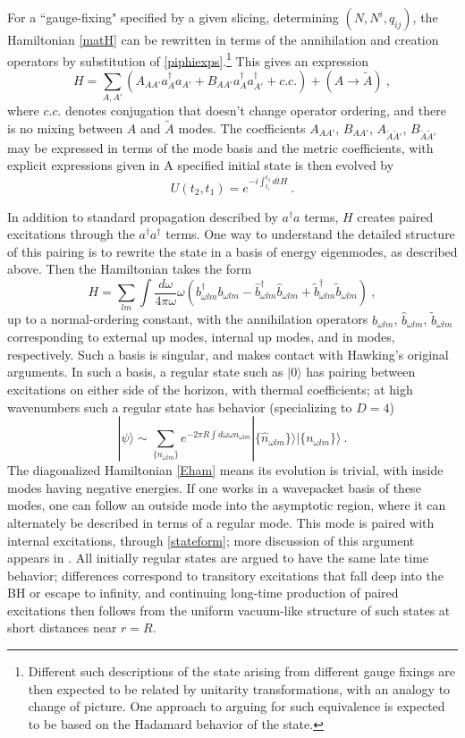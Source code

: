 \documentclass[12pt]{article}
\numberwithin{equation}{section}
\newcommand{\beq}{\begin{equation}}
\newcommand{\eeq}{\end{equation}}
\newcommand{\tA}{{\tilde A}}
\begin{document}
For a ``gauge-fixing" specified by a  given slicing, determining $(N, N^i, q_{ij})$, the Hamiltonian \eqref{matH} can be rewritten in terms of the annihilation and creation operators by substitution of \eqref{piphiexps}.\footnote{Different such descriptions of the state arising from different gauge fixings are then expected to be related by unitarity transformations, with an analogy to change of picture.  One approach to arguing for such equivalence is expected to be based on the Hadamard behavior of the state\cite{KaWa}.} This gives an expression
\beq\label{Hama}
H = \sum_{A,A'} \left(A_{AA'} a^\dagger_A a_{A'} + B_{AA'} a^\dagger_A a^\dagger_{A'} + c.c. \right) + (A\rightarrow \tilde A)\ ,
\eeq
where $c.c.$ denotes conjugation that doesn't change operator ordering, and there is no mixing between $A$ and $\tilde A$ modes.  The coefficients $A_{AA'}$, $B_{AA'}$, $A_{\tA\tA'}$, $B_{\tA\tA'}$ may be expressed in terms of the mode basis and the metric coefficients, with explicit expressions given in \cite{SEHS,SE2d,GiPe1}
A specified initial state is then evolved by
\beq\label{Uev}
U(t_2,t_1)= e^{-i\int_{t_1}^{t_2} dt H}\ .
\eeq

In addition to standard propagation described by $a^\dagger a$ terms, $H$ creates paired excitations through the $a^\dagger a^\dagger$ terms.  One way to understand the detailed structure of this pairing is to rewrite the state in a basis of energy eigenmodes, as described above.  
Then the Hamiltonian takes the form\cite{GiPe1}
\beq\label{Eham}
H= \sum_{lm} \int \frac{d\omega}{4 \pi \omega} \omega (b_{\omega lm}^{\dagger}b_{\omega lm} - \hat b_{\omega lm}^{\dagger} \hat b_{\omega lm} + \tilde b_{\omega lm}^{\dagger}\tilde b_{\omega lm}  )  \ ,
\eeq 
up to a normal-ordering constant, with the annihilation operators $b_{\omega lm}$, $\hat b_{\omega lm}$, $\tilde b_{\omega lm}$ corresponding to external up modes, internal up modes, and in modes, respectively.
Such a basis is singular, and makes contact with Hawking's original arguments\cite{Hawk}.  In such a basis, a regular state such as $|0\rangle$ has pairing between excitations on either side of the horizon, with thermal coefficients; at high wavenumbers such a regular state has behavior (specializing to $D=4$)
\beq\label{stateform}
|\psi\rangle \sim\sum_{\{n_{\omega lm}\}} e^{-2\pi R\int d\omega \omega n_{\omega lm} }| \{\hat n_{\omega lm}\} \rangle |\{n_{\omega lm}\}\rangle\ .
\eeq
The diagonalized Hamiltonian \eqref{Eham} means its evolution is trivial, with inside modes having negative energies.  If one works in a wavepacket basis of these modes, one can follow an outside mode into the asymptotic region, where it can alternately be described in terms of a regular mode.  This mode is paired with internal excitations, through \eqref{stateform}; more discussion of this argument appears in \cite{GiPe1}.  All initially regular states are argued to have the same late time behavior; differences correspond to transitory excitations that fall deep into the BH or escape to infinity, and continuing long-time production of paired excitations then follows from the uniform vacuum-like structure of such states at short distances near $r=R$.
\end{document}
